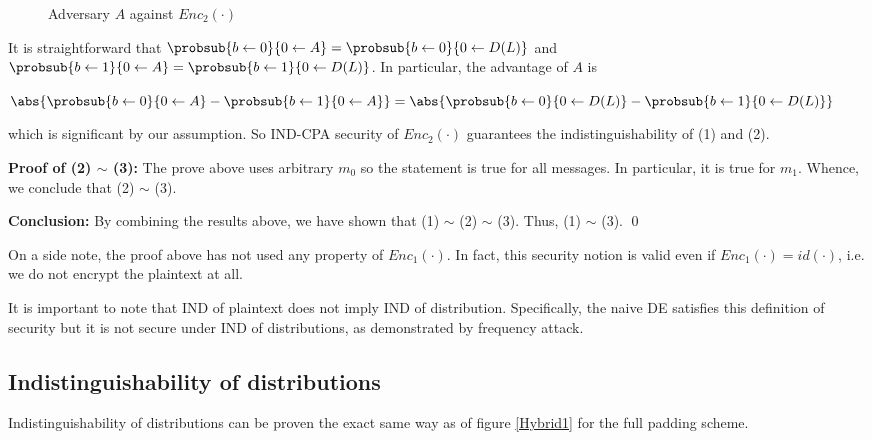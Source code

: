 \documentclass[10pt]{article}
\begin{document}
\begin{figure}[H]
	\begin{center}
		\caption{Adversary $A$ against $Enc_2(\cdot)$}
	\end{center}
\end{figure}

It is straightforward that $\probsub{b \gets 0}{0 \gets A} = \probsub{b \gets 0}{0 \gets D(L)}$ and $\probsub{b \gets 1}{0 \gets A} = \probsub{b \gets 1}{0 \gets D(L)}$. In particular, the advantage of $A$ is
\begin{center}
$\abs{\probsub{b \gets 0}{0 \gets A} - \probsub{b \gets 1}{0 \gets A}} = \abs{\probsub{b \gets 0}{0 \gets D(L)} - \probsub{b \gets 1}{0 \gets D(L)}}$
\end{center}
which is significant by our assumption. So IND-CPA security of $Enc_2(\cdot)$ guarantees the indistinguishability of (1) and (2).

\textbf{Proof of (2) $\sim$ (3): } The prove above uses arbitrary $m_0$ so the statement is true for all messages. In particular, it is true for $m_1$. Whence, we conclude that (2) $\sim$ (3).

\textbf{Conclusion: } By combining the results above, we have shown that (1) $\sim$ (2) $\sim$ (3). Thus, (1) $\sim$ (3). \qed

On a side note, the proof above has not used any property of $Enc_1(\cdot)$. In fact, this security notion is valid even if $Enc_1(\cdot) = id(\cdot)$, i.e. we do not encrypt the plaintext at all.

It is important to note that IND of plaintext does not imply IND of distribution. Specifically, the naive DE satisfies this definition of security but it is not secure under IND of distributions, as demonstrated by frequency attack.




\subsection{Indistinguishability of distributions}
Indistinguishability of distributions can be proven the exact same way as of figure \ref{Hybrid1} for the full padding scheme.
\end{document}
